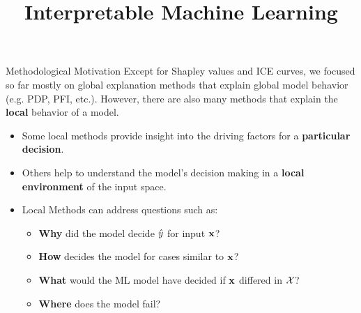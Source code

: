 \documentclass[11pt,compress,t,notes=noshow, aspectratio=169, xcolor=table]{beamer}
\title{Interpretable Machine Learning}
\date{}
\begin{document}



 \newcommand{\titlefigure}{figure/lime.png}
\newcommand{\learninggoals}{
\item Understand motivation for local explanations 
\item Develop an intuition for possible use-cases
\item Know characteristics of local explanation methods}



\begin{vbframe}{Methodological Motivation}
Except for Shapley values and ICE curves, we focused so far mostly on global explanation methods that explain global model behavior (e.g. PDP, PFI, etc.). However, there are also many methods that explain the \textbf{local} behavior of a model.
	\begin{itemize}
		\item Some local methods provide insight into the driving factors for a \textbf{particular decision}.
		\item Others help to understand the model's decision making in a \textbf{local environment} of the input space.
		\item Local Methods can address questions such as: 
		\begin{itemize}
		    \item \textbf{Why} did the model decide $\hat{y}$ for input $\mathbf{x}$?
		    \item \textbf{How} decides the model for cases similar to $\mathbf{x}$?
		    \item \textbf{What} would the ML model have decided if $\mathbf{x}$ differed in $\mathcal{X}$?
		    \item  \textbf{Where} does the model fail?
		\end{itemize}  
	\end{itemize}
\end{vbframe}
\end{document}
